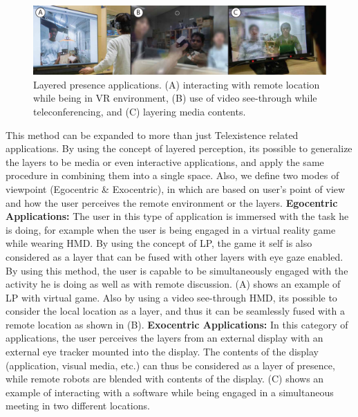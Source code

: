 \begin{figure}[b!]
  \centering
  \captionsetup{justification=centering}
  \includegraphics[width=1\linewidth]{figures/eval/Layered/Applications.pdf}
  \par
  \caption{Layered presence applications. (A) interacting with remote location while being in VR environment, (B) use of video see-through while teleconferencing, and (C) layering media contents.}
  \vspace*{\floatsep}
  \label{fig:LP-applications}
\end{figure}

This method can be expanded to more than just Telexistence related applications. By using the concept of layered perception, its possible to generalize the layers to be media or even interactive applications, and apply the same procedure in combining them into a single space. Also, we define two modes of viewpoint (Egocentric \& Exocentric), in which are based on user's point of view and how the user perceives the remote environment or the layers.
\newline
\textbf{Egocentric Applications:} The user in this type of application is immersed with the task he is doing, for example when the user is being engaged in a virtual reality game while wearing HMD. By using the concept of LP, the game it self is also considered as a layer that can be fused with other layers with eye gaze enabled. By using this method, the user is capable to be simultaneously engaged with the activity he is doing as well as with remote discussion.  (A) shows an example of LP with virtual game. Also by using a video see-through HMD, its possible to consider the local location as a layer, and thus it can be seamlessly fused with a remote location as shown in  (B). 
\newline
\textbf{Exocentric Applications:} In this category of applications, the user perceives the layers from an external display with an external eye tracker mounted into the display. The contents of the display (application, visual media, etc.) can thus be considered as a layer of presence, while remote robots are blended with contents of the display.  (C) shows an example of interacting with a software while being engaged in a simultaneous meeting in two different locations. 


